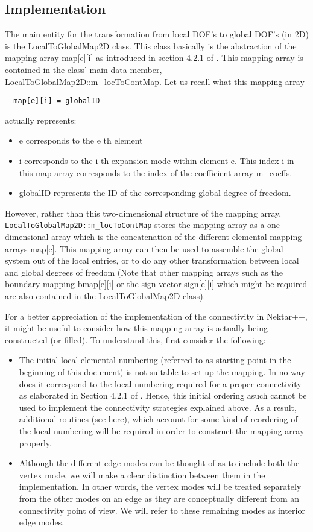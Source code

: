 \subsection{Implementation}
The main entity for the transformation from local DOF's to global DOF's (in 2D)
is the LocalToGlobalMap2D class. This class basically is the abstraction of the
mapping array map[e][i] as introduced in section 4.2.1 of \cite{KaSh05}. This
mapping array is contained in the class' main data member,
LocalToGlobalMap2D::m\_locToContMap. Let us recall what this mapping array 
\begin{lstlisting}
  map[e][i] = globalID
\end{lstlisting}
actually represents:
\begin{itemize}
\item e corresponds to the e th element
\item i corresponds to the i th expansion
mode within element e. This index i in this map array corresponds to the index of
 the coefficient array m\_coeffs.
\item globalID represents the ID of the corresponding global degree of freedom.
\end{itemize}

However, rather than this two-dimensional structure of the mapping array,
\texttt{LocalToGlobalMap2D::m\_locToContMap} stores the mapping array as a
one-dimensional array which is the concatenation of the different elemental
mapping arrays map[e]. This mapping array can then be used to assemble the
global system out of the local entries, or to do any other transformation
between local and global degrees of freedom (Note that other mapping arrays such
as the boundary mapping bmap[e][i] or the sign vector sign[e][i] which might be
required are also contained in the LocalToGlobalMap2D class).

For a better appreciation of the implementation of the connectivity in Nektar++,
it might be useful to consider how this mapping array is actually being
constructed (or filled). To understand this, first consider the following:
\begin{itemize}
\item The initial local elemental numbering (referred to as starting point in
the beginning of this document) is not suitable to set up the mapping. In no way
 does it correspond to the local numbering required for a proper connectivity as
 elaborated in Section 4.2.1 of \cite{KaSh05}. Hence, this initial ordering
 asuch cannot be used to implement the connectivity strategies explained above. As a
 result, additional routines (see here), which account for some kind of
 reordering of the local numbering will be required in order to construct the
 mapping array properly.
\item Although the different edge modes can be thought of as to include both
the vertex mode, we will make a clear distinction between them in the
 implementation. In other words, the vertex modes will be treated separately
 from the other modes on an edge as they are conceptually different from an
 connectivity point of view. We will refer to these remaining modes as interior
 edge modes.
\end{itemize}

